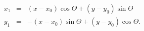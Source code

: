 \begin{article}
%
%



\begin{eqnarray}
   x_{1} & = & (x - x_{0}) \cos \Theta + 
        (y - y_{0}) \sin \Theta \\ 
   y_{1} & = & -(x - x_{0}) \sin \Theta + 
        (y - y_{0}) \cos \Theta.
\end{eqnarray}



\end{article}
